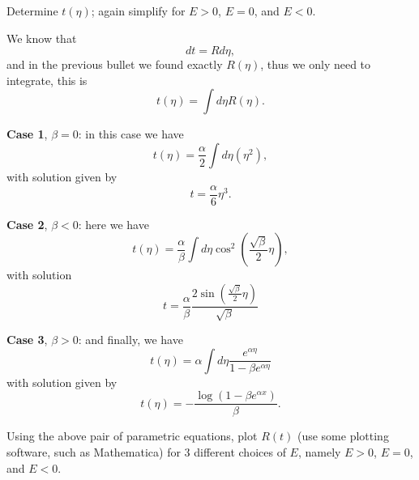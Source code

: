 \documentclass[11pt]{article}
\begin{document}
\pagebreak
\begin{problem}
	Determine $t(\eta)$; again simplify for $E > 0$, $E = 0$, and $E < 0$.
\end{problem}

\begin{solution}
We know that
\begin{displaymath}
    dt = Rd\eta,
\end{displaymath}
and in the previous bullet we found exactly $R(\eta)$, thus we only need to integrate, this is
\begin{displaymath}
  t(\eta) = \int d\eta R(\eta).
\end{displaymath}


\textbf{Case 1}, $\beta=0$: in this case we have
\begin{displaymath}
  t(\eta) = \frac{\alpha}{2} \int d\eta \left(\eta^2\right),
\end{displaymath}
with solution given by
\begin{displaymath}
  t = \frac{\alpha}{6}\eta^3.
\end{displaymath}


\textbf{Case 2}, $\beta<0$: here we have
\begin{displaymath}
  t(\eta) = \frac{\alpha}{\beta}\int d\eta \cos^2\left( \frac{\sqrt{\beta}}{2}\eta \right),
\end{displaymath}
with solution
\begin{displaymath}
  t = \frac{\alpha}{\beta}\frac{2\sin\left (\frac{\sqrt{\beta}}{2}\eta\right )}{\sqrt{\beta}}
\end{displaymath}


\textbf{Case 3}, $\beta>0$: and finally, we have
\begin{displaymath}
  t(\eta) = \alpha \int d\eta \frac{e^{\alpha\eta}}{1-\beta e^{\alpha\eta}}
\end{displaymath}
with solution given by
\begin{displaymath}
  t(\eta) = -\frac{\log \left(1-\beta  e^{\alpha  x}\right)}{\beta }.
\end{displaymath}
	
\end{solution}

\pagebreak
\begin{problem}
	Using the above pair of parametric equations, plot $R(t)$ (use some plotting software, such as Mathematica) for 3 different choices of $E$, namely $E > 0$, $E = 0$, and $E < 0$.
\end{problem}
\end{document}
